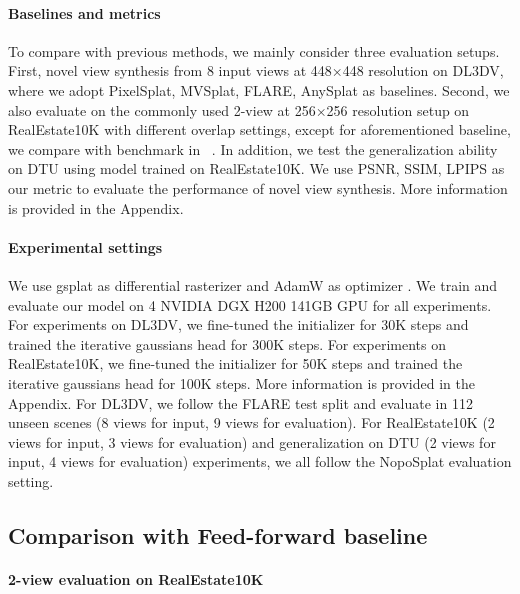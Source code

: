 

\paragraph{Baselines and metrics} 
To compare with previous methods, we mainly consider three evaluation setups. First, novel view synthesis from 8 input views at 448×448 resolution on DL3DV, where we adopt PixelSplat, MVSplat, FLARE, AnySplat as baselines. Second, we also evaluate on the commonly used 2-view at 256×256 resolution setup on RealEstate10K \cite{zhou2018stereo} with different overlap settings, except for aforementioned baseline, we compare with benchmark in ~\cite{ye2024no}. In addition, we test the generalization ability on DTU using model trained on RealEstate10K. We use PSNR, SSIM, LPIPS as our metric to evaluate the performance of novel view synthesis. More information is provided in the  Appendix.



\paragraph{Experimental settings} We use gsplat \cite{yu2024mip} as differential rasterizer and AdamW as optimizer . We train and evaluate our model on 4 NVIDIA DGX H200 141GB GPU for all experiments. For experiments on DL3DV, we fine-tuned the initializer for 30K steps and trained the iterative gaussians head for 300K steps. For experiments on RealEstate10K, we fine-tuned the initializer for 50K steps and trained the iterative gaussians head for 100K steps. More information is provided in the Appendix. For DL3DV, we follow the FLARE test split and evaluate in 112 unseen scenes (8 views for input, 9 views for evaluation). For RealEstate10K (2 views for input, 3 views for evaluation) and generalization on DTU (2 views for input, 4 views for evaluation) experiments, we all follow the NopoSplat evaluation setting. 


\subsection{Comparison with Feed-forward baseline}

\paragraph{2-view evaluation on RealEstate10K}

